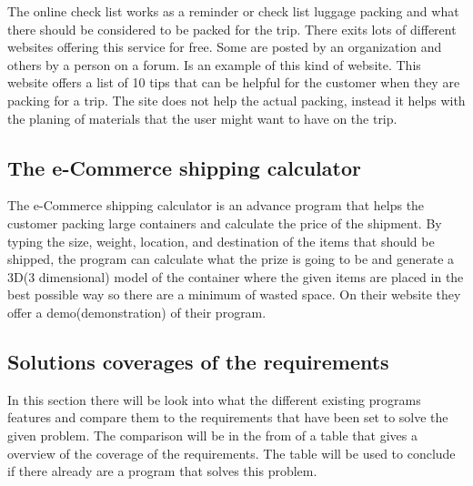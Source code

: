 The online check list works as a reminder or check list luggage packing and what there should be considered to be packed for the trip. There exits lots of different websites offering this service for free. Some are posted by an organization and others by a person on a forum. %
Is an example of this kind of website. This website offers a list of 10 tips that can be helpful for the customer when they are packing for a trip. The site does not help the actual packing, instead it helps with the planing of materials that the user might want to have on the trip.

\subsection{The e-Commerce shipping calculator}

The e-Commerce shipping calculator is an advance program that helps the customer packing large containers and calculate the price of the shipment.
By typing the size, weight, location, and destination of the items that should be shipped, the program can calculate what the prize is going to be and generate a 3D(3 dimensional) model of the container where the given items are placed in the best possible way so there are a minimum of wasted space. On their website %
they offer a demo(demonstration) of their program.

\subsection{Solutions coverages of the requirements}

In this section there will be look into what the different existing programs features and compare them to the requirements that have been set to solve the given problem. The comparison will be in the from of a table that gives a overview of the coverage of the requirements. The table will be used to conclude if there already are a program that solves this problem.

